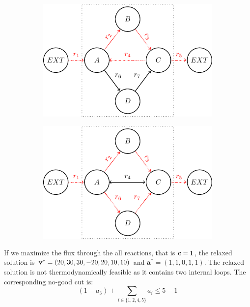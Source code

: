 \begin{figure}[H]
\begin{subfigure}{0.47\textwidth}
        \includegraphics[width=0.99\linewidth]{Images/tikz_graphs_two_loops_cb_1.pdf}
        \caption{}
    \end{subfigure}
    \begin{subfigure}{0.47\textwidth}
    \centering
        \includegraphics[width=0.99\linewidth]{Images/tikz_graphs_two_loops_ll_fba.pdf}
        \caption{}
    \end{subfigure}
\end{figure}

If we maximize the flux through the all reactions, that is $\bold c = \bold 1$, the relaxed solution is $\bold v^* = (20, 30, 30, -20, 20, 10, 10)$ and $\boldsymbol a^* = (1,1,0,1,1)$. The relaxed solution is not thermodynamically feasible as it contains two internal loops. The corresponding no-good cut is:
\begin{equation*}
    (1-a_3) + \sum_{i \in \{1,2,4,5\}} a_i \leq 5-1
\end{equation*}

